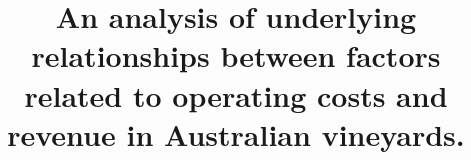 \documentclass[review,12pt,authoryear]{elsarticle}
\begin{document}
\begin{linenumbers}
\begin{frontmatter}



\title{An analysis of underlying relationships between factors related to operating costs and revenue in Australian vineyards.}



% 




\end{frontmatter}
\end{linenumbers}
\end{document}
